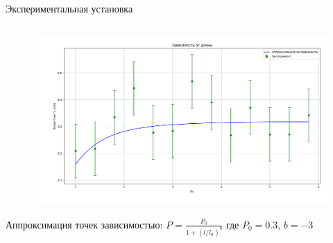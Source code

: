 \begin{frame}{Экспериментальная установка}
\begin{columns}
\begin{column}{0.6\linewidth}
			\begin{figure}[H]
				\includegraphics[width=1\linewidth]{img/exp_er.png}
			\end{figure}
			Аппроксимация точек зависимостью:
			$P = \frac{P_0}{1+(l/l_0)^b}$
			где $P_0 = 0.3$, $b = -3$

		\end{column}

	\end{columns}

%
%
%
%
%
%

\end{frame}

